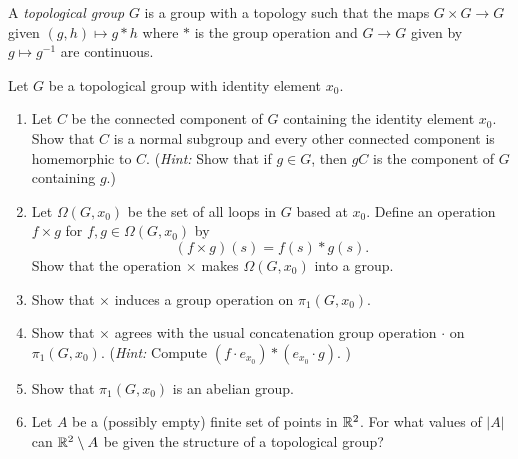 \documentclass[12pt]{article}
\begin{document}




\begin{problem}{1}
\begin{defn}
    A \emph{topological group}  $G$ is a group with a topology such that the maps $G \times G \to G$ given $(g,h) \mapsto g * h$ where $*$ is the group operation and $G \to G$ given by $g \mapsto g^{-1}$ are continuous. 
\end{defn}
    Let $G$ be a topological group with identity element $x_0$.
    \begin{enumerate}
    
    \item Let $C$ be the connected component of $G$ containing the identity element $x_0$. Show that $C$ is a normal subgroup and every other connected component is homemorphic to $C$. (\emph{Hint:} Show that if $g \in G$, then $gC$ is the component of $G$ containing $g$.)

    \item Let $\Omega(G,x_0)$ be the set of all loops in $G$ based at $x_0$. Define an operation $f \times g$ for $f, g \in \Omega(G,x_0)$ by
    \[ (f \times g)(s) = f(s) \ast g(s). \]
    Show that the operation $\times$ makes $\Omega(G,x_0)$ into a group. 

    \item Show that $\times$ induces a group operation on $\pi_1(G,x_0)$.

    \item Show that $\times$ agrees with the usual concatenation group operation $\cdot$ on $\pi_1(G,x_0)$. (\emph{Hint:} Compute $(f \cdot e_{x_0}) \ast (e_{x_0} \cdot g)$. )

    \item Show that $\pi_1(G,x_0)$ is an abelian group.

    \item Let $A$ be a (possibly empty) finite set of points in $\mathbb R^2$. For what values of $|A|$ can $\mathbb R^2 \setminus A$ be given the structure of a topological group? 
    \end{enumerate}
\end{problem}
\newpage
\end{document}
